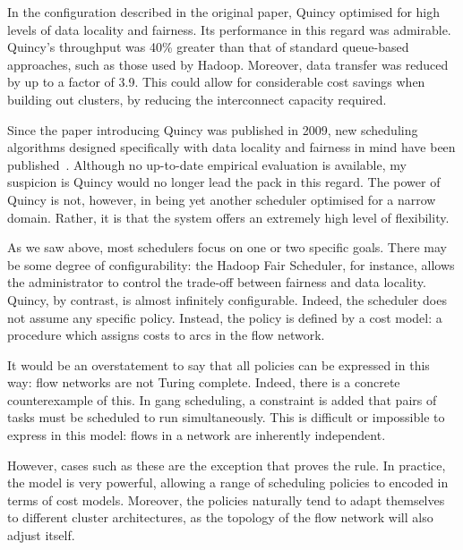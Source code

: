 In the configuration described in the original paper, Quincy optimised for high levels of data locality and fairness. Its performance in this regard was admirable. Quincy's throughput was 40\% greater than that of standard queue-based approaches, such as those used by Hadoop. Moreover, data transfer was reduced by up to a factor of 3.9. This could allow for considerable cost savings when building out clusters, by reducing the interconnect capacity required.

Since the paper introducing Quincy was published in 2009, new scheduling algorithms designed specifically with data locality and fairness in mind have been published~\cite{Guo:2012,Jin:2011,Ibrahim:2010}. Although no up-to-date empirical evaluation is available, my suspicion is Quincy would no longer lead the pack in this regard. The power of Quincy is not, however, in being yet another scheduler optimised for a narrow domain. Rather, it is that the system offers an extremely high level of flexibility.

As we saw above, most schedulers focus on one or two specific goals. There may be some degree of configurability: the Hadoop Fair Scheduler, for instance, allows the administrator to control the trade-off between fairness and data locality. Quincy, by contrast, is almost infinitely configurable. Indeed, the scheduler does not assume any specific policy. Instead, the policy is defined by a cost model: a procedure which assigns costs to arcs in the flow network.

It would be an overstatement to say that all policies can be expressed in this way: flow networks are not Turing complete. Indeed, there is a concrete counterexample of this. In gang scheduling\footnotemark, a constraint is added that pairs of tasks must be scheduled to run simultaneously. This is difficult or impossible to express in this model: flows in a network are inherently independent.

However, cases such as these are the exception that proves the rule. In practice, the model is very powerful, allowing a range of scheduling policies to encoded in terms of cost models. Moreover, the policies naturally tend to adapt themselves to different cluster architectures, as the topology of the flow network will also adjust itself.

